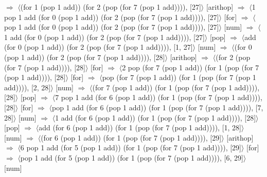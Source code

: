 \documentclass[12pt]{report}
\begin{document}
$\Rightarrow$ $\langle$(for 1 (pop 1 add)) (for 2 (pop (for 7 (pop 1 add)))), [27]$\rangle$ \hfill [arithop] \newline
$\Rightarrow$ $\langle$1 pop 1 add (for 0 (pop 1 add)) (for 2 (pop (for 7 (pop 1 add)))), [27]$\rangle$ \hfill [for] \newline
$\Rightarrow$ $\langle$pop 1 add (for 0 (pop 1 add)) (for 2 (pop (for 7 (pop 1 add)))), [27]$\rangle$ \hfill [num] \newline
$\Rightarrow$ $\langle$1 add (for 0 (pop 1 add)) (for 2 (pop (for 7 (pop 1 add)))), [27]$\rangle$ \hfill [pop] \newline
$\Rightarrow$ $\langle$add (for 0 (pop 1 add)) (for 2 (pop (for 7 (pop 1 add)))), [1, 27]$\rangle$ \hfill [num] \newline
$\Rightarrow$ $\langle$(for 0 (pop 1 add)) (for 2 (pop (for 7 (pop 1 add)))), [28]$\rangle$ \hfill [arithop] \newline
$\Rightarrow$ $\langle$(for 2 (pop (for 7 (pop 1 add)))), [28]$\rangle$ \hfill [for] \newline
$\Rightarrow$ $\langle$2 pop (for 7 (pop 1 add)) (for 1 (pop (for 7 (pop 1 add)))), [28]$\rangle$ \hfill [for] \newline
$\Rightarrow$ $\langle$pop (for 7 (pop 1 add)) (for 1 (pop (for 7 (pop 1 add)))), [2, 28]$\rangle$ \hfill [num] \newline
$\Rightarrow$ $\langle$(for 7 (pop 1 add)) (for 1 (pop (for 7 (pop 1 add)))), [28]$\rangle$ \hfill [pop] \newline
$\Rightarrow$ $\langle$7 pop 1 add (for 6 (pop 1 add)) (for 1 (pop (for 7 (pop 1 add)))), [28]$\rangle$ \hfill [for] \newline
$\Rightarrow$ $\langle$pop 1 add (for 6 (pop 1 add)) (for 1 (pop (for 7 (pop 1 add)))), [7, 28]$\rangle$ \hfill [num] \newline
$\Rightarrow$ $\langle$1 add (for 6 (pop 1 add)) (for 1 (pop (for 7 (pop 1 add)))), [28]$\rangle$ \hfill [pop] \newline
$\Rightarrow$ $\langle$add (for 6 (pop 1 add)) (for 1 (pop (for 7 (pop 1 add)))), [1, 28]$\rangle$ \hfill [num] \newline
$\Rightarrow$ $\langle$(for 6 (pop 1 add)) (for 1 (pop (for 7 (pop 1 add)))), [29]$\rangle$ \hfill [arithop] \newline
$\Rightarrow$ $\langle$6 pop 1 add (for 5 (pop 1 add)) (for 1 (pop (for 7 (pop 1 add)))), [29]$\rangle$ \hfill [for] \newline
$\Rightarrow$ $\langle$pop 1 add (for 5 (pop 1 add)) (for 1 (pop (for 7 (pop 1 add)))), [6, 29]$\rangle$ \hfill [num] \newline
\end{document}
